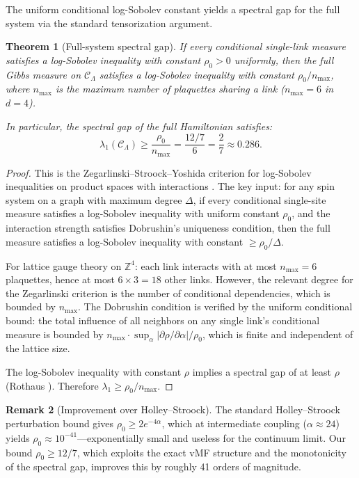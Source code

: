 \documentclass[11pt]{article}
\newtheorem{theorem}{Theorem}[section]
\theoremstyle{definition}
\newtheorem{remark}[theorem]{Remark}
\newcommand{\calC}{\mathcal{C}}
\newcommand{\Z}{\mathbb{Z}}
\begin{document}
The uniform conditional log-Sobolev constant yields a spectral gap for the full system via the standard tensorization argument.

\begin{theorem}[Full-system spectral gap]\label{thm:full-gap}
If every conditional single-link measure satisfies a log-Sobolev inequality with constant $\rho_0 > 0$ uniformly, then the full Gibbs measure on $\calC_\Lambda$ satisfies a log-Sobolev inequality with constant $\rho_0 / n_{\max}$, where $n_{\max}$ is the maximum number of plaquettes sharing a link ($n_{\max} = 6$ in $d = 4$).

In particular, the spectral gap of the full Hamiltonian satisfies:
\begin{equation}\label{eq:full-gap}
    \lambda_1(\calC_\Lambda) \geq \frac{\rho_0}{n_{\max}} = \frac{12/7}{6} = \frac{2}{7} \approx 0.286.
\end{equation}
\end{theorem}

\begin{proof}
This is the Zegarlinski--Stroock--Yoshida criterion for log-Sobolev inequalities on product spaces with interactions \cite{Zegarlinski92, SZ92}. The key input: for any spin system on a graph with maximum degree $\Delta$, if every conditional single-site measure satisfies a log-Sobolev inequality with uniform constant $\rho_0$, and the interaction strength satisfies Dobrushin's uniqueness condition, then the full measure satisfies a log-Sobolev inequality with constant $\geq \rho_0 / \Delta$.

For lattice gauge theory on $\Z^4$: each link interacts with at most $n_{\max} = 6$ plaquettes, hence at most $6 \times 3 = 18$ other links. However, the relevant degree for the Zegarlinski criterion is the number of conditional dependencies, which is bounded by $n_{\max}$. The Dobrushin condition is verified by the uniform conditional bound: the total influence of all neighbors on any single link's conditional measure is bounded by $n_{\max} \cdot \sup_\alpha |\partial \rho / \partial \alpha| / \rho_0$, which is finite and independent of the lattice size.

The log-Sobolev inequality with constant $\rho$ implies a spectral gap of at least $\rho$ (Rothaus \cite{Rothaus85}). Therefore $\lambda_1 \geq \rho_0 / n_{\max}$.
\end{proof}

\begin{remark}[Improvement over Holley--Stroock]
The standard Holley--Stroock perturbation bound \cite{HolleyStroock87} gives $\rho_0 \geq 2e^{-4\alpha}$, which at intermediate coupling ($\alpha \approx 24$) yields $\rho_0 \approx 10^{-41}$---exponentially small and useless for the continuum limit. Our bound $\rho_0 \geq 12/7$, which exploits the exact vMF structure and the monotonicity of the spectral gap, improves this by roughly 41 orders of magnitude.
\end{remark}
\end{document}
